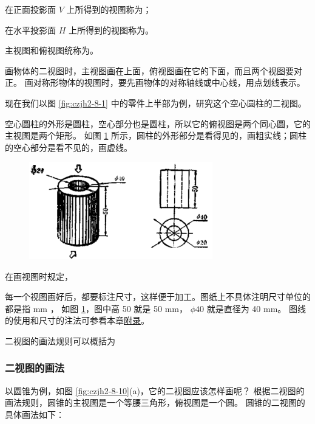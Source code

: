 在正面投影面 $V$ 上所得到的视图称为；

在水平投影面 $H$ 上所得到的视图称为。

主视图和俯视图统称为。

画物体的二视图时，主视图画在上面，俯视图画在它的下面，而且两个视图要对正。
画对称形物体的视图时，要先画物体的对称轴线或中心线，用点划线表示。

现在我们以图 \ref{fig:czjh2-8-1} 中的零件上半部为例，研究这个空心圆柱的二视图。

空心圆柱的外形是圆柱，空心部分也是圆柱，所以它的俯视图是两个同心圆，它的主视图是两个矩形。
如图 \ref{fig:czjh2-8-9} 所示，圆柱的外形部分是看得见的，画粗实线；圆柱的空心部分是看不见的，画虚线。

\begin{figure}[htbp]
    \centering
    \includegraphics[width=8cm]{../pic/czjh2-ch8-09.png}
    \caption{}\label{fig:czjh2-8-9}
\end{figure}

在画视图时规定，

每一个视图画好后，都要标注尺寸，这样便于加工。图纸上不具体注明尺寸单位的都是指 mm ，
如图 \ref{fig:czjh2-8-9}，图中高 50 就是 50 mm， $\phi 40$ 就是直径为 40 mm。
图线的使用和尺寸的注法可参看本章\hyperref[sec:czjh2-8-fulu]{附录}。

二视图的画法规则可以概括为

\begin{center}
\end{center}


\subsubsection{二视图的画法}

以圆锥为例，如图 \ref{fig:czjh2-8-10}(a)，它的二视图应该怎样画呢？
根据二视图的画法规则，圆锥的主视图是一个等腰三角形，俯视图是一个圆。
圆锥的二视图的具体画法如下：

